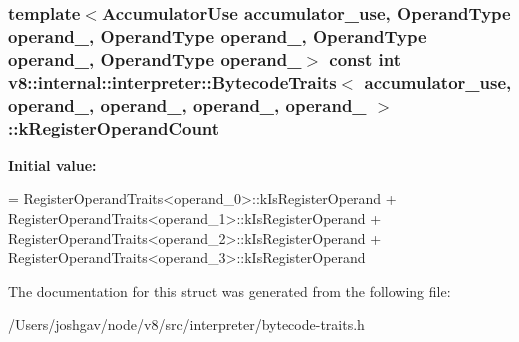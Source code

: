 \subsubsection[{\texorpdfstring{k\+Register\+Operand\+Count}{kRegisterOperandCount}}]{\setlength{\rightskip}{0pt plus 5cm}template$<$Accumulator\+Use accumulator\+\_\+use, Operand\+Type operand\+\_, Operand\+Type operand\+\_, Operand\+Type operand\+\_, Operand\+Type operand\+\_$>$ const int {\bf v8\+::internal\+::interpreter\+::\+Bytecode\+Traits}$<$ accumulator\+\_\+use, operand\+\_, operand\+\_, operand\+\_,                                                                                                                                                           operand\+\_ $>$\+::k\+Register\+Operand\+Count\hspace{0.3cm}{\ttfamily [static]}}\hypertarget{structv8_1_1internal_1_1interpreter_1_1_bytecode_traits_3_01accumulator__use_00_01operand__0_00_ad1f88ba519d8dcf4785ba91ce1cb8bd_ac6a89885c0ffbcf695bc38c47bae03da}{}\label{structv8_1_1internal_1_1interpreter_1_1_bytecode_traits_3_01accumulator__use_00_01operand__0_00_ad1f88ba519d8dcf4785ba91ce1cb8bd_ac6a89885c0ffbcf695bc38c47bae03da}
{\bfseries Initial value\+:}
\begin{DoxyCode}
=
      RegisterOperandTraits<operand\_0>::kIsRegisterOperand +
      RegisterOperandTraits<operand\_1>::kIsRegisterOperand +
      RegisterOperandTraits<operand\_2>::kIsRegisterOperand +
      RegisterOperandTraits<operand\_3>::kIsRegisterOperand
\end{DoxyCode}


The documentation for this struct was generated from the following file\+:\begin{DoxyCompactItemize}
\item 
/\+Users/joshgav/node/v8/src/interpreter/bytecode-\/traits.\+h\end{DoxyCompactItemize}
